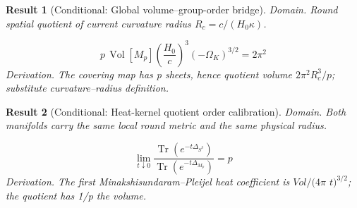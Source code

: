 \documentclass[aps,prd,onecolumn,notitlepage,groupedaddress,11pt]{revtex4-2}
\newtheorem{result}{Result}
\begin{document}
\begin{result}[\textsf{Conditional}: Global volume--group-order bridge]\label{bridge:13}
\textit{Domain.} Round spatial quotient of current curvature radius \(R_c=c/(H_0\kappa)\).\par
\begin{equation}\label{bridgeeq:13}
p\,\operatorname{Vol}[M_p]\left(\frac{H_0}{c}\right)^3(-\Omega_K)^{3/2}=2\pi^2
\end{equation}
\textit{Derivation.} The covering map has p sheets, hence quotient volume \(2\pi^2R_c^3/p\); substitute curvature--radius definition.
\end{result}
\begin{result}[\textsf{Conditional}: Heat-kernel quotient order calibration]\label{bridge:14}
\textit{Domain.} Both manifolds carry the same local round metric and the same physical radius.\par
\begin{equation}\label{bridgeeq:14}
\lim_{t\downarrow0}\frac{\operatorname{Tr}(e^{-t\Delta_{S^3}})}{\operatorname{Tr}(e^{-t\Delta_{M_p}})}=p
\end{equation}
\textit{Derivation.} The first Minakshisundaram--Pleijel heat coefficient is \(Vol/(4\pi\) \(t)^{3/2}\); the quotient has 1/p the volume.
\end{result}
\end{document}
